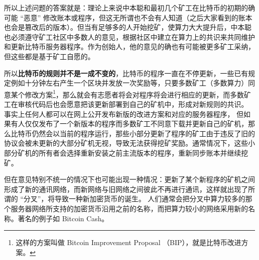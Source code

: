 所以上述问题的答案就是：理论上来说中本聪和最初几个矿工在比特币的初期的确可能 “恶意” 修改账本或程序，但这无所谓也不会有人知道（之后大家看到的账本也会是篡改后的版本）。但当有足够多的人开始挖矿，使算力大大提升后，中本聪也必须遵守矿工社区中多数人的意见，根据社区中建立在算力上的共识来共同维护和更新比特币服务器程序。作为创始人，他的意见的确也有可能被更多矿工采纳，但这些都是基于矿工自愿的。

所以\textbf{比特币的规则并不是一成不变的}，比特币的程序一直在不停更新，一些已有规定例如十分钟左右产生一个区块并发放一次奖励等，只要多数矿工（多数算力）同意某个修改方案\footnote{这样的方案叫做 Bitcoin Improvement Proposal （BIP），就是比特币改进方案。}，那么就会有志愿者将会对程序将会进行相应的更新，而多数矿工在审核代码后也会愿意把该更新部署到自己的矿机中，形成对新规则的共识。 事实上任何人都可以在网上公开发布新版的改进方案和对应的服务器程序， 但如果有人仅仅发布了一个新版本的程序而多数矿工不同意下载并更新自己的矿机，那么比特币仍然会以当前的程序运行，那些小部分更新了程序的矿工由于违反了旧的协议会被未更新的大部分矿机无视，导致无法获得挖矿奖励。通常情况下，这些小部分矿机的所有者会选择重新安装之前主流版本的程序，重新同步账本并继续挖矿。

但在意见特别不统一的情况下也可能出现一种情况：更新了某个新程序的矿机之间形成了新的通讯网络，而新网络与旧网络之间彼此不再进行通讯，这样就出现了所谓的 “分叉”，将导致一种新加密货币的诞生。 人们通常会把分叉中算力较多的那个服务器网络所支持的加密货币沿用之前的名称，而把算力较小的网络采用新的名称。著名的例子如 Bitcoin Cash。

